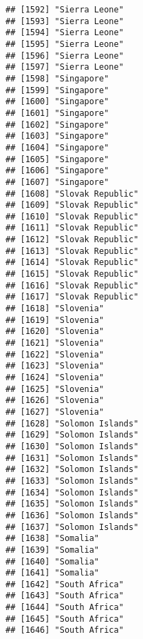 \documentclass[]{article}
\begin{document}
\begin{verbatim}
## [1592] "Sierra Leone"                       
## [1593] "Sierra Leone"                       
## [1594] "Sierra Leone"                       
## [1595] "Sierra Leone"                       
## [1596] "Sierra Leone"                       
## [1597] "Sierra Leone"                       
## [1598] "Singapore"                          
## [1599] "Singapore"                          
## [1600] "Singapore"                          
## [1601] "Singapore"                          
## [1602] "Singapore"                          
## [1603] "Singapore"                          
## [1604] "Singapore"                          
## [1605] "Singapore"                          
## [1606] "Singapore"                          
## [1607] "Singapore"                          
## [1608] "Slovak Republic"                    
## [1609] "Slovak Republic"                    
## [1610] "Slovak Republic"                    
## [1611] "Slovak Republic"                    
## [1612] "Slovak Republic"                    
## [1613] "Slovak Republic"                    
## [1614] "Slovak Republic"                    
## [1615] "Slovak Republic"                    
## [1616] "Slovak Republic"                    
## [1617] "Slovak Republic"                    
## [1618] "Slovenia"                           
## [1619] "Slovenia"                           
## [1620] "Slovenia"                           
## [1621] "Slovenia"                           
## [1622] "Slovenia"                           
## [1623] "Slovenia"                           
## [1624] "Slovenia"                           
## [1625] "Slovenia"                           
## [1626] "Slovenia"                           
## [1627] "Slovenia"                           
## [1628] "Solomon Islands"                    
## [1629] "Solomon Islands"                    
## [1630] "Solomon Islands"                    
## [1631] "Solomon Islands"                    
## [1632] "Solomon Islands"                    
## [1633] "Solomon Islands"                    
## [1634] "Solomon Islands"                    
## [1635] "Solomon Islands"                    
## [1636] "Solomon Islands"                    
## [1637] "Solomon Islands"                    
## [1638] "Somalia"                            
## [1639] "Somalia"                            
## [1640] "Somalia"                            
## [1641] "Somalia"                            
## [1642] "South Africa"                       
## [1643] "South Africa"                       
## [1644] "South Africa"                       
## [1645] "South Africa"                       
## [1646] "South Africa"                       

\end{verbatim}
\end{document}
